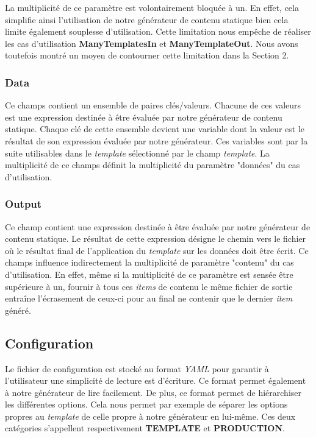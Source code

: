 			La multiplicité de ce paramètre est volontairement bloquée à un. En effet, cela simplifie ainsi l'utilisation de notre générateur de contenu statique bien cela limite également souplesse d'utilisation. Cette limitation nous empêche de réaliser les cas d'utilisation \textbf{ManyTemplatesIn} et \textbf{ManyTemplateOut}. Nous avons toutefois montré un moyen de contourner cette limitation dans la Section 2.
		
		\subsubsection*{Data}
			Ce champs contient un ensemble de paires clés/valeurs. Chacune de ces valeurs est une expression destinée à être évaluée par notre générateur de contenu statique. Chaque clé de cette ensemble devient une variable dont la valeur est le résultat de son expression évaluée par notre générateur. Ces variables sont par la suite utilisables dans le \textit{template} sélectionné par le champ \textit{template}. La multiplicité de ce champs définit la multiplicité du paramètre "données" du cas d'utilisation. 
		
		\subsubsection*{Output}
			Ce champ contient une expression destinée à être évaluée par notre générateur de contenu statique. Le résultat de cette expression désigne le chemin vers le fichier où le résultat final de l'application du \textit{template} sur les données doit être écrit. Ce champs influence indirectement la multiplicité de paramètre "contenu" du cas d'utilisation. En effet, même si la multiplicité de ce paramètre est sensée être supérieure à un, fournir à tous ces \textit{items} de contenu le même fichier de sortie entraîne l'écrasement de ceux-ci pour au final ne contenir que le dernier \textit{item} généré.
	
	
	\subsection{Configuration}
	
		Le fichier de configuration est stocké au format \textit{YAML} pour garantir à l'utilisateur une simplicité de lecture est d'écriture. Ce format permet également à notre générateur de lire facilement. De plus, ce format permet de hiérarchiser les différentes options. Cela nous permet par exemple de séparer les options propres au \textit{template} de celle propre à notre générateur en lui-même. Ces deux catégories s'appellent respectivement \textbf{TEMPLATE} et \textbf{PRODUCTION}.
		
